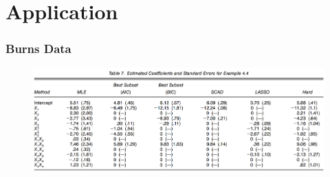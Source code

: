\documentclass{beamer}
\begin{document}
	\section{Application}
	\begin{frame}
		\frametitle{Burns Data}
		\begin{figure}
			\includegraphics[width=1\linewidth]{image025.png}
		\end{figure}
	\end{frame}
	
	
	
	
\end{document}
